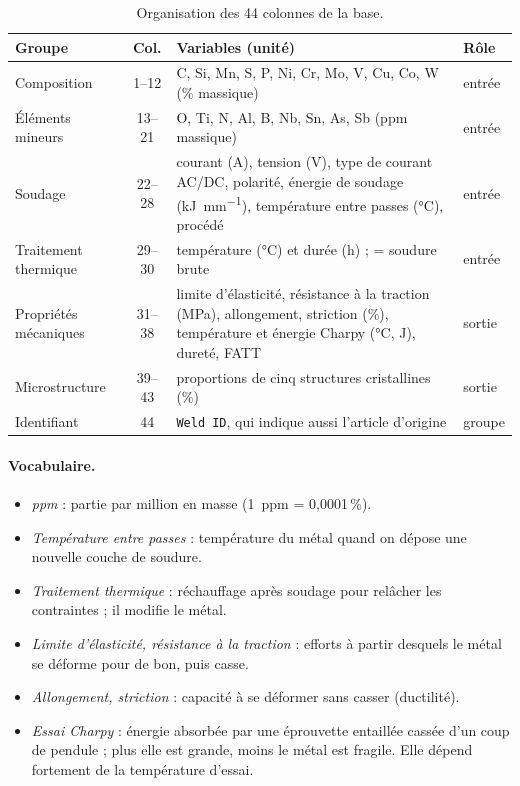 \begin{table}[!htbp]
  \centering\small
  \begin{tabularx}{\linewidth}{@{}l c Y l@{}}
    \toprule
    \textbf{Groupe} & \textbf{Col.} & \textbf{Variables (unité)} & \textbf{Rôle} \\
    \midrule
    Composition       & 1--12  & C, Si, Mn, S, P, Ni, Cr, Mo, V, Cu, Co, W (\% massique) & entrée \\
    Éléments mineurs  & 13--21 & O, Ti, N, Al, B, Nb, Sn, As, Sb (ppm massique) & entrée \\
    Soudage           & 22--28 & courant (\si{\ampere}), tension (\si{\volt}), type de
                                 courant AC/DC, polarité, énergie de soudage
                                 (\si{\kilo\joule\per\milli\metre}), température entre
                                 passes (\si{\celsius}), procédé & entrée \\
    Traitement thermique & 29--30 & température (\si{\celsius}) et durée (\si{\hour}) ;
                                  = soudure brute & entrée \\
    Propriétés mécaniques & 31--38 & limite d'élasticité, résistance à la traction
                                 (\si{\mega\pascal}), allongement, striction (\%),
                                 température et énergie Charpy (\si{\celsius},
                                 \si{\joule}), dureté, FATT & sortie \\
    Microstructure    & 39--43 & proportions de cinq structures cristallines (\%) & sortie \\
    Identifiant       & 44     & \texttt{Weld ID}, qui indique aussi l'article d'origine & groupe \\
    \bottomrule
  \end{tabularx}
  \caption{Organisation des 44 colonnes de la base.}
  \label{tab:colonnes}
\end{table}

\paragraph{Vocabulaire.}
\begin{itemize}
  \item \emph{ppm} : partie par million en masse (\SI{1}{ppm} = 0,0001\,\%).
  \item \emph{Température entre passes} : température du métal quand on dépose une
    nouvelle couche de soudure.
  \item \emph{Traitement thermique} : réchauffage après soudage pour relâcher les
    contraintes ; il modifie le métal.
  \item \emph{Limite d'élasticité, résistance à la traction} : efforts à partir desquels
    le métal se déforme pour de bon, puis casse.
  \item \emph{Allongement, striction} : capacité à se déformer sans casser (ductilité).
  \item \emph{Essai Charpy} : énergie absorbée par une éprouvette entaillée cassée d'un
    coup de pendule ; plus elle est grande, moins le métal est fragile. Elle dépend
    fortement de la température d'essai.
\end{itemize}

